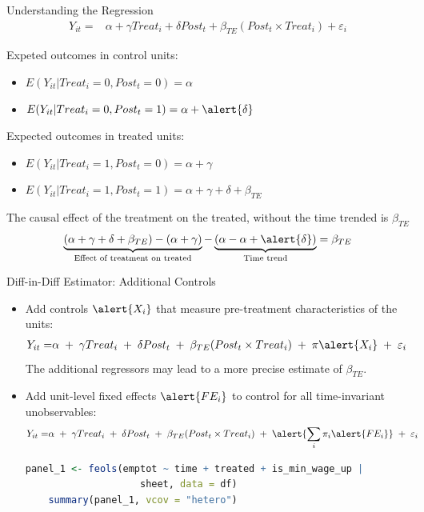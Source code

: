 \documentclass[9pt,aspectratio=169]{beamer}
\begin{document}
\begin{frame}{Understanding the Regression}
\linespread{1.3}\selectfont %
\vspace{-0.2cm}
\begin{align*}
  Y_{it}=& \alpha + \gamma Treat_i + \delta Post_t + \beta_{TE} (Post_t \times Treat_i) + \varepsilon_i 
\end{align*}

Expeted outcomes in control units:
\begin{itemize}
    \item $E(Y_{it}|Treat_i=0,Post_t=0)= \alpha$
    \item $E(Y_{it}|Treat_i=0,Post_t=1)= \alpha + \alert{\delta}$
\end{itemize} \pause
Expected outcomes in treated units:
\begin{itemize}
    \item $E(Y_{it}|Treat_i=1,Post_t=0)= \alpha + \gamma$
    \item $E(Y_{it}|Treat_i=1,Post_t=1)= \alpha + \gamma  + \delta  + \beta_{TE}$
\end{itemize} 
\pause
The causal effect of the treatment on the treated, without the time trended is $\beta_{TE}$
\begin{align*}
    \underbrace{(\alpha + \gamma  + \delta  + \beta_{TE}) - (\alpha + \gamma)}_{\text{Effect of treatment on treated}}
    - 
    \underbrace{(\alpha -\alpha + \alert{\delta})}_{\text{Time trend}}
    = 
    \beta_{TE}
\end{align*}
\end{frame}



\begin{frame}[fragile]{Diff-in-Diff Estimator: Additional Controls}

\begin{itemize}
    \item Add controls $\alert{X_i}$ that measure pre-treatment characteristics of the units:
    \begin{align*}
    Y_{it}=& \alpha \;+\; \gamma Treat_i \;+\; \delta Post_t \;+\; \beta_{TE} (Post_t \times Treat_i) \;+\; \pi \alert{X_i} \;+\; \varepsilon_i 
    \end{align*}
    The additional regressors may lead to a more precise estimate of $\beta_{TE}$.
    \pause
    \vspace{1cm}
    \item Add unit-level fixed effects $\alert{FE_i}$ to control for all time-invariant unobservables:
    \begin{align*}
    Y_{it}=& \alpha \;+\; \gamma Treat_i \;+\; \delta Post_t \;+\; \beta_{TE} (Post_t \times Treat_i) \;+\; \alert{\sum_i \pi_i \alert{FE_i}} \;+\; \varepsilon_i 
    \end{align*} \pause
    \begin{lstlisting}[language=R]
    panel_1 <- feols(emptot ~ time + treated + is_min_wage_up | 
                    sheet, data = df)
    summary(panel_1, vcov = "hetero")
    \end{lstlisting}
\end{itemize}
\end{frame}
\end{document}

